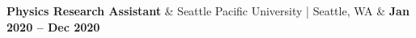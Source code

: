 \textbf{Physics Research Assistant} & 
Seattle Pacific University | Seattle, WA & 
\textbf{Jan 2020 -- Dec 2020}